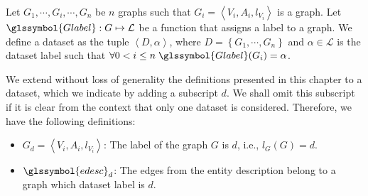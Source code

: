 \begin{definition}[Dataset]
Let $G_1, \cdots, G_i, \cdots, G_n$ be $n$ graphs such that $G_i = \left\langle V_i, A_i, l_{V_i} \right\rangle$ is a graph.
Let $\glssymbol{Glabel} : G \mapsto \mathcal{L}$ be a function that assigns a label to a graph.
We define a dataset as the tuple $\left\langle D, \alpha \right\rangle$, where $D = \left\lbrace G_1, \cdots, G_n \right\rbrace$ and $\alpha \in \mathcal{L}$ is the dataset label such that $\forall 0 < i \le n\; \glssymbol{Glabel}(G_i) = \alpha$.
\end{definition}

We extend without loss of generality the definitions presented in this chapter to a dataset, which we indicate by adding a subscript $d$. We shall omit this subscript if it is clear from the context that only one dataset is considered. Therefore, we have the following definitions:

\begin{itemize}
\item $G_d = \left\langle V_i, A_i, l_{V_i} \right\rangle$: The label of the graph $G$ is $d$, i.e., $l_G(G) = d$.
\item $\glssymbol{edesc}_d$: The edges from the entity description belong to a graph which dataset label is $d$.
\end{itemize}
